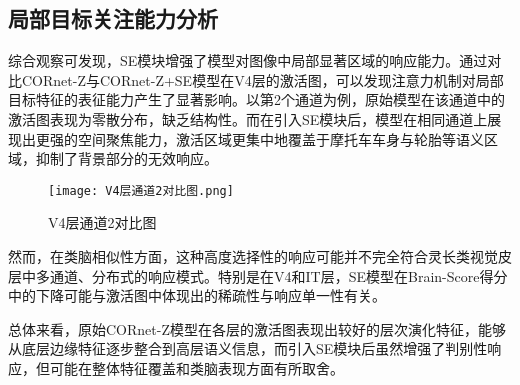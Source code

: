\subsection{局部目标关注能力分析}

综合观察可发现，SE模块增强了模型对图像中局部显著区域的响应能力。通过对比CORnet-Z与CORnet-Z+SE模型在V4层的激活图，可以发现注意力机制对局部目标特征的表征能力产生了显著影响。以第2个通道为例，原始模型在该通道中的激活图表现为零散分布，缺乏结构性。而在引入SE模块后，模型在相同通道上展现出更强的空间聚焦能力，激活区域更集中地覆盖于摩托车车身与轮胎等语义区域，抑制了背景部分的无效响应。

\begin{figure}[hbt]
	\centering
	\texttt{[image: V4层通道2对比图.png]}
	\caption{V4层通道2对比图}
	\label{f.v4_2_act}
\end{figure}

然而，在类脑相似性方面，这种高度选择性的响应可能并不完全符合灵长类视觉皮层中多通道、分布式的响应模式。特别是在V4和IT层，SE模型在Brain-Score得分中的下降可能与激活图中体现出的稀疏性与响应单一性有关。

总体来看，原始CORnet-Z模型在各层的激活图表现出较好的层次演化特征，能够从底层边缘特征逐步整合到高层语义信息，而引入SE模块后虽然增强了判别性响应，但可能在整体特征覆盖和类脑表现方面有所取舍。
